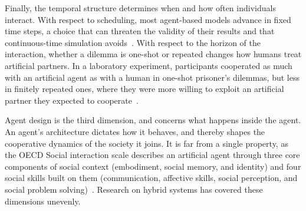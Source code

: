 
Finally, the temporal structure determines when and how often individuals interact. With respect to scheduling, most agent-based models advance in fixed time steps, a choice that can threaten the validity of their results and that continuous-time simulation avoids~\cite{kosterFastEmbeddedLanguage2024}. With respect to the horizon of the interaction, whether a dilemma is one-shot or repeated changes how humans treat artificial partners. In a laboratory experiment, participants cooperated as much with an artificial agent as with a human in one-shot prisoner's dilemmas, but less in finitely repeated ones, where they were more willing to exploit an artificial partner they expected to cooperate~\cite{barreda-tarrazonaExploitingMachineHuman2026}.


Agent design is the third dimension, and concerns what happens inside the agent. An agent's architecture dictates how it behaves, and thereby shapes the cooperative dynamics of the society it joins. It is far from a single property, as the OECD Social interaction scale describes an artificial agent through three core components of social context (embodiment, social memory, and identity) and four social skills built on them (communication, affective skills, social perception, and social problem solving)~\cite{oecdIntroducingOECDAI2025}. Research on hybrid systems has covered these dimensions unevenly. 


